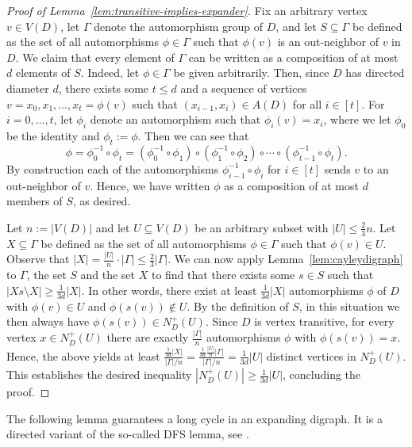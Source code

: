 \documentclass[english,11pt]{article}
\theoremstyle{definition}
\numberwithin{equation}{section}
\numberwithin{figure}{section}
\begin{document}
\begin{proof}[Proof of Lemma~\ref{lem:transitive-implies-expander}]
Fix an arbitrary vertex $v\in V(D)$, let $\Gamma$ denote the automorphism group of $D$, and let $S\subseteq \Gamma$ be defined as the set of all automorphisms $\phi\in \Gamma$ such that $\phi(v)$ is an out-neighbor of $v$ in $D$. We claim that every element of $\Gamma$ can be written as a composition of at most $d$ elements of $S$. Indeed, let $\phi\in \Gamma$ be given arbitrarily. Then, since $D$ has directed diameter $d$, there exists some $t\le d$ and a sequence of vertices $v=x_0,x_1,\ldots,x_t=\phi(v)$ such that $(x_{i-1},x_i)\in A(D)$ for all $i\in [t]$. For $i=0,\ldots,t$, let $\phi_i$ denote an automorphism such that $\phi_i(v)=x_i$, where we let $\phi_0$ be the identity and $\phi_t:=\phi$. Then we can see that 
$$\phi=\phi_0^{-1}\circ\phi_t=(\phi_0^{-1}\circ \phi_{1})\circ (\phi_{1}^{-1}\circ \phi_{2})\circ \cdots \circ (\phi_{t-1}^{-1}\circ \phi_t).$$
By construction each of the automorphisms $\phi_{i-1}^{-1}\circ \phi_{i}$ for $i\in [t]$ sends $v$ to an out-neighbor of $v$. Hence, we have written $\phi$ as a composition of at most $d$ members of $S$, as desired. 

Let $n:=|V(D)|$ and let $U\subseteq V(D)$ be an arbitrary subset with $|U|\le \frac{2}{3}n$. Let $X\subseteq \Gamma$ be defined as the set of all automorphisms $\phi\in \Gamma$ such that $\phi(v)\in U$. Observe that $|X|=\frac{|U|}{n}\cdot|\Gamma|\le \frac{2}{3}|\Gamma|$. We can now apply Lemma~\ref{lem:cayleydigraph} to $\Gamma$, the set $S$ and the set $X$ to find that there exists some $s\in S$ such that $|Xs\setminus X|\ge \frac{1}{3d}|X|$. In other words, there exist at least $\frac{1}{3d}|X|$ automorphisms $\phi$ of $D$ with $\phi(v)\in U$ and $\phi(s(v))\notin U$. By the definition of $S$, in this situation we then always have $\phi(s(v))\in N_D^+(U)$. Since $D$ is vertex transitive, for every vertex $x\in N_D^+(U)$ there are exactly $\frac{|\Gamma|}{n}$ automorphisms $\phi$ with $\phi(s(v))=x$. Hence, the above yields at least $\frac{\frac{1}{3d}|X|}{|\Gamma|/n}=\frac{\frac{1}{3d}\frac{|U|}{n}|\Gamma|}{|\Gamma|/n}=\frac{1}{3d}|U|$ distinct vertices in $N_D^+(U)$. This establishes the desired inequality $|N_D^+(U)|\ge \frac{1}{3d}|U|$, concluding the proof.
\end{proof}

The following lemma guarantees a long cycle in an expanding digraph. It is a directed variant of the so-called DFS lemma, see \cite{michael-survey}.
\end{document}
